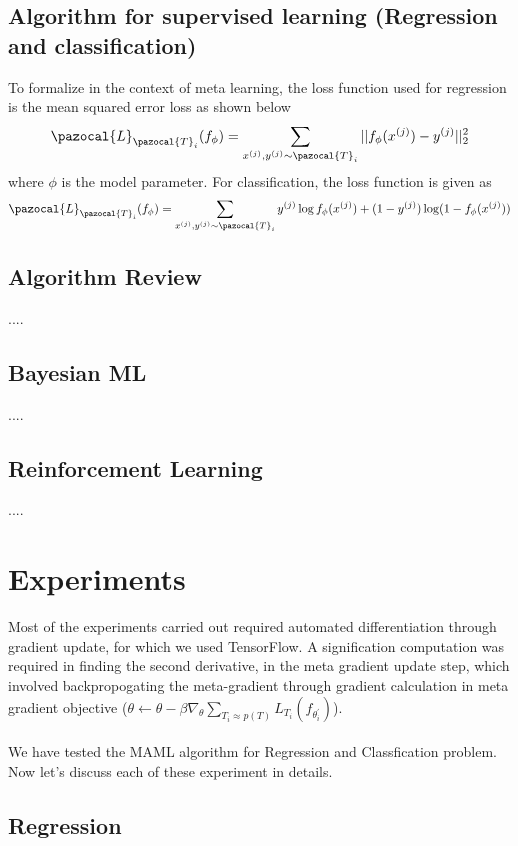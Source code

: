 \documentclass[a4paper]{article}
\newcommand{\Lb}{\pazocal{L}}
\newcommand{\Tb}{\pazocal{T}}
\begin{document}
\subsection{Algorithm for supervised learning (Regression and classification)}
To formalize in the context of meta learning, the loss function used for regression is the mean squared error loss as shown below
$$ \Lb_{\Tb_{i}}(f_\phi) = \sum_{x^{(j)}, y^{(j) }\sim\Tb_{i}} || f_{\phi}(x^{(j)}) - y^{(j)} ||^2_2 $$
where $\phi$ is the model parameter.
For classification, the loss function is given as
$$ \Lb_{\Tb_{i}}(f_\phi) = \sum_{x^{(j)}, y^{(j) }\sim\Tb_{i}} y^{(j)} \log f_{\phi}(x^{(j)}) + (1-y^{(j)}) \log (1 - f_{\phi}(x^{(j)})) $$


\subsection*{Algorithm Review}

....

\subsection*{Bayesian ML}

....

\subsection*{Reinforcement Learning}

....

\pagebreak
\section{Experiments}
Most of the experiments carried out required automated differentiation through gradient update, 
for which we used TensorFlow. 
A signification computation was required in finding the second derivative, 
in the meta gradient update step, 
which involved backpropogating the meta-gradient through gradient calculation in meta gradient objective ($\theta \leftarrow \theta - \beta \nabla_\theta \sum_{T_i \approx p(T)} L_{T_i}(f_{\theta^{'}_i}) $). \\ \\
We have tested the MAML algorithm for Regression and Classfication problem. Now let's discuss each of these experiment in details.

\subsection{Regression}
\end{document}
